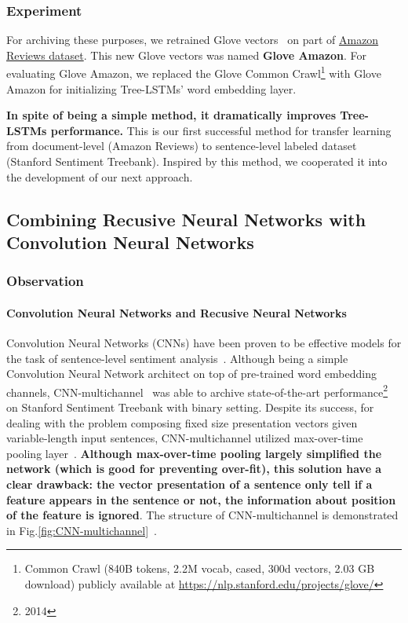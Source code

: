 \subsubsection{Experiment}
For archiving these purposes, we retrained Glove vectors~\cite{glove} on part of  \hyperref[sec:amazon]{Amazon Reviews dataset}.
This new Glove vectors was named \textbf{Glove Amazon}.
For evaluating Glove Amazon, we replaced the Glove Common Crawl\footnote{Common Crawl (840B tokens, 2.2M vocab, cased, 300d vectors, 2.03 GB download) publicly available at \url{https://nlp.stanford.edu/projects/glove/}} with Glove Amazon for initializing Tree-LSTMs' word embedding layer.

\textbf{In spite of being a simple method, it dramatically improves Tree-LSTMs performance.}
This is our first successful method for transfer learning from document-level (Amazon Reviews) to sentence-level labeled dataset (Stanford Sentiment Treebank).
Inspired by this method, we cooperated it into the development of our next approach.

\subsection{Combining Recusive Neural Networks with Convolution Neural Networks}

\subsubsection{Observation}
\paragraph{Convolution Neural Networks and Recusive Neural Networks}
Convolution Neural Networks (CNNs) have been proven to be effective models for the task of sentence-level sentiment analysis~\cite{KimCNN}.
Although being a simple Convolution Neural Network architect on top of pre-trained word embedding channels, CNN-multichannel~\cite{KimCNN} was able to archive state-of-the-art performance\footnote{2014} on Stanford Sentiment Treebank with binary setting.
Despite its success, for dealing with the problem composing fixed size presentation vectors given variable-length input sentences, CNN-multichannel utilized max-over-time pooling layer~\cite{nlp-scratch}.
\textbf{Although max-over-time pooling largely simplified the network (which is good for preventing over-fit), this solution have a clear drawback: the vector presentation of a sentence only tell if a feature appears in the sentence or not, the information about position of the feature is ignored}.
The structure of CNN-multichannel is demonstrated in Fig.\ref{fig:CNN-multichannel}~\cite{KimCNN}.

